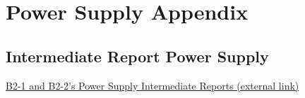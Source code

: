 \chapter{Power Supply Appendix}

\section{Intermediate Report Power Supply}
\href{https://github.com/Miyanooooo/FinalReport.git}{B2-1 and B2-2's Power Supply Intermediate Reports (external link)}


